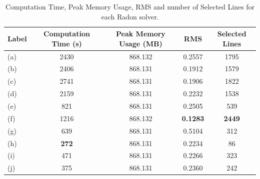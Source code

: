 \begin{table}[!ht]
\centering
\caption{Computation Time, Peak Memory Usage, RMS and number of Selected Lines for each Radon solver.}
\begin{tabularx}{\textwidth}{l C C C C}
\toprule
\textbf{Label} & \textbf{Computation Time (s)} & \textbf{Peak Memory Usage (MB)} & \textbf{RMS} & \textbf{Selected Lines} \\
\midrule
(a) & 2430            & 868.132            & 0.2557            & 1795 \\
(b) & 2406            & 868.131            & 0.1912            & 1579 \\
(c) & 2741            & 868.131            & 0.1906            & 1822 \\
(d) & 2159            & 868.131            & 0.2232            & 1538 \\
(e) &  821            & 868.131            & 0.2505            &  539 \\
(f) & 1216            & 868.132            & \textbf{0.1283}   & \textbf{2449} \\
(g) &  639            & 868.131            & 0.5104            &  312 \\
(h) &  \textbf{272}   & 868.131            & 0.2234            &   86 \\
(i) &  471            & 868.131            & 0.2266            &  323 \\
(j) &  375            & 868.131            & 0.2360            &  242 \\
\bottomrule
\end{tabularx}
\end{table}